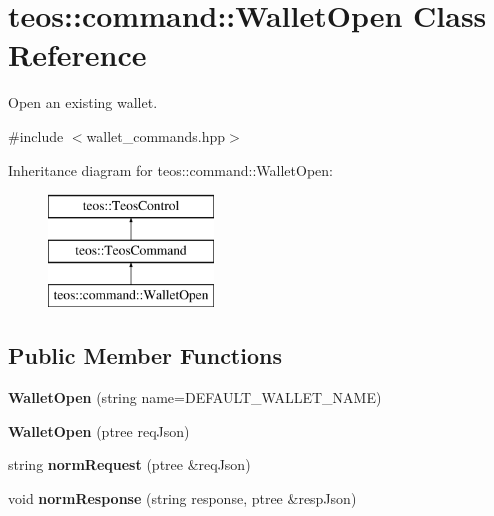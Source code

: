 \hypertarget{classteos_1_1command_1_1_wallet_open}{}\section{teos\+:\+:command\+:\+:Wallet\+Open Class Reference}
\label{classteos_1_1command_1_1_wallet_open}


Open an existing wallet.  




{\ttfamily \#include $<$wallet\+\_\+commands.\+hpp$>$}

Inheritance diagram for teos\+:\+:command\+:\+:Wallet\+Open\+:\begin{figure}[H]
\begin{center}
\leavevmode
\includegraphics[height=3.000000cm]{classteos_1_1command_1_1_wallet_open}
\end{center}
\end{figure}
\subsection*{Public Member Functions}
\begin{DoxyCompactItemize}
\item 
\mbox{\label{classteos_1_1command_1_1_wallet_open_a83737d8d2e5f335266e331e3771c50b4}} 
{\bfseries Wallet\+Open} (string name=D\+E\+F\+A\+U\+L\+T\+\_\+\+W\+A\+L\+L\+E\+T\+\_\+\+N\+A\+ME)
\item 
\mbox{\label{classteos_1_1command_1_1_wallet_open_afe4f67f6e891bf5dcc4e5fb02e372e3f}} 
{\bfseries Wallet\+Open} (ptree req\+Json)
\item 
\mbox{\label{classteos_1_1command_1_1_wallet_open_a7de38b779a421c4964af4679dc5d24f7}} 
string {\bfseries norm\+Request} (ptree \&req\+Json)
\item 
\mbox{\label{classteos_1_1command_1_1_wallet_open_aa8b15aa97a21e79224d627a7417f1bda}} 
void {\bfseries norm\+Response} (string response, ptree \&resp\+Json)
\end{DoxyCompactItemize}
